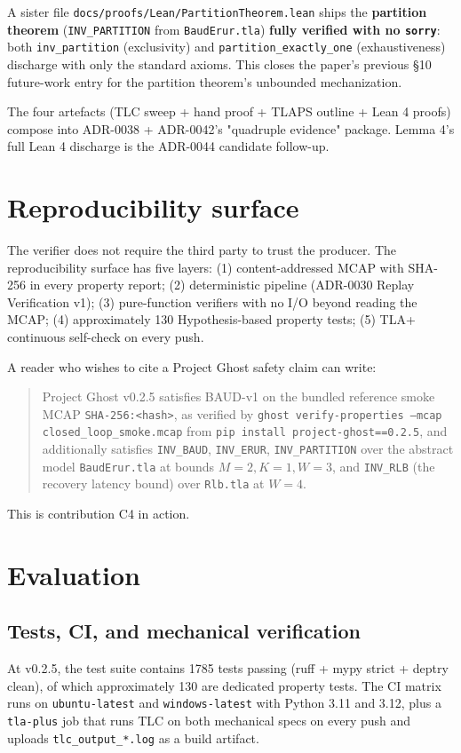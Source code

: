 \documentclass[11pt,a4paper]{article}
\begin{document}
A sister file
\texttt{docs/proofs/Lean/PartitionTheorem.lean} ships the
\textbf{partition theorem} (\texttt{INV\_PARTITION} from
\texttt{BaudErur.tla}) \textbf{fully verified with no \texttt{sorry}}:
both \texttt{inv\_partition} (exclusivity) and
\texttt{partition\_exactly\_one} (exhaustiveness) discharge with
only the standard axioms. This closes the paper's previous
\S10 future-work entry for the partition theorem's unbounded
mechanization.

The four artefacts (TLC sweep + hand proof + TLAPS outline + Lean
4 proofs) compose into ADR-0038 + ADR-0042's "quadruple evidence"
package. Lemma 4's full Lean 4 discharge is the ADR-0044
candidate follow-up.

\section{Reproducibility surface}
\label{sec:reproducibility}

The verifier does not require the third party to trust the
producer. The reproducibility surface has five layers: (1)
content-addressed
MCAP with SHA-256 in every property report; (2) deterministic
pipeline (ADR-0030 Replay Verification v1); (3) pure-function
verifiers with no I/O beyond reading the MCAP; (4) approximately 130
Hypothesis-based property tests; (5) TLA+ continuous self-check on
every push.

A reader who wishes to cite a Project Ghost safety claim can write:
\begin{quote}\small
Project Ghost v0.2.5 satisfies BAUD-v1 on the bundled reference
smoke MCAP \texttt{SHA-256:<hash>}, as verified by
\texttt{ghost verify-properties --mcap closed\_loop\_smoke.mcap}
from \texttt{pip install project-ghost==0.2.5}, and additionally
satisfies \texttt{INV\_BAUD}, \texttt{INV\_ERUR},
\texttt{INV\_PARTITION} over the abstract model
\texttt{BaudErur.tla} at bounds $M{=}2, K{=}1, W{=}3$, and
\texttt{INV\_RLB} (the recovery latency bound) over
\texttt{Rlb.tla} at $W{=}4$.
\end{quote}
This is contribution C4 in action.

\section{Evaluation}
\label{sec:evaluation}

\subsection{Tests, CI, and mechanical verification}
At v0.2.5, the test suite contains 1785 tests passing (ruff +
mypy strict + deptry clean), of which approximately 130 are
dedicated property tests. The CI matrix runs on
\texttt{ubuntu-latest} and \texttt{windows-latest} with Python
3.11 and 3.12, plus a \texttt{tla-plus} job that runs TLC on both
mechanical specs on every push and uploads
\texttt{tlc\_output\_*.log} as a build artifact.
\end{document}
